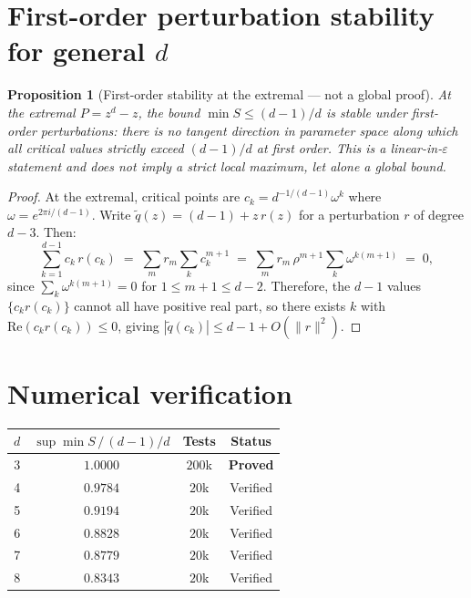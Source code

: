 \documentclass[11pt,a4paper]{article}
\newtheorem{proposition}[theorem]{Proposition}
\begin{document}
\section{First-order perturbation stability for general $d$}\label{sec:pert}

\begin{proposition}[First-order stability at the extremal --- not a global proof]
At the extremal $P = z^d - z$, the bound $\min S \le (d - 1)/d$ is stable under first-order perturbations: there is no tangent direction in parameter space along which all critical values strictly exceed $(d-1)/d$ at first order. This is a linear-in-$\varepsilon$ statement and does \emph{not} imply a strict local maximum, let alone a global bound.
\end{proposition}

\begin{proof}
At the extremal, critical points are $c_k = d^{-1/(d-1)} \omega^k$ where $\omega = e^{2\pi i/(d-1)}$. Write $\tilde q(z) = (d - 1) + z\, r(z)$ for a perturbation $r$ of degree $d - 3$. Then:
\begin{equation*}
\sum_{k=1}^{d-1} c_k\, r(c_k) \;=\; \sum_m r_m \sum_k c_k^{m+1} \;=\; \sum_m r_m\, \rho^{m+1} \sum_k \omega^{k(m+1)} \;=\; 0,
\end{equation*}
since $\sum_k \omega^{k(m+1)} = 0$ for $1 \le m + 1 \le d - 2$. Therefore, the $d - 1$ values $\{c_k r(c_k)\}$ cannot all have positive real part, so there exists $k$ with $\mathrm{Re}(c_k r(c_k)) \le 0$, giving $|\tilde q(c_k)| \le d - 1 + O(\|r\|^2)$. \qedhere
\end{proof}

\section{Numerical verification}

\begin{center}
\begin{tabular}{cccc}
\toprule
$d$ & $\sup \min S \,/\, (d-1)/d$ & Tests & Status \\
\midrule
3  & $1.0000$ & $200$k & \textbf{Proved} \\
4  & $0.9784$ & $20$k  & Verified \\
5  & $0.9194$ & $20$k  & Verified \\
6  & $0.8828$ & $20$k  & Verified \\
7  & $0.8779$ & $20$k  & Verified \\
8  & $0.8343$ & $20$k  & Verified \\
\bottomrule
\end{tabular}
\end{center}
\end{document}
